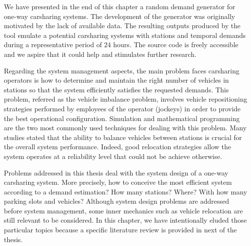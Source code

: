 \begin{bibunit}[ieeetr]
\medskip
We have presented in the end of this chapter a random demand generator for one-way carsharing systems.
The development of the generator was originally motivated by the lack of available data.
The resulting outputs produced by the tool emulate a potential carsharing systems with stations and temporal demands during a representative period of $24$ hours.
The source code is freely accessible \cite{csgen} and we aspire that it could help and stimulates further research.


\medskip
Regarding the system management aspects, the main problem faces carsharing operators is how to determine and maintain the right number of vehicles in stations so that the system efficiently satisfies the requested demands.
This problem, referred as the vehicle imbalance problem, involves vehicle repositioning strategies performed by employees of the operator (jockeys) in order to provide the best operational configuration.
Simulation and mathematical programming are the two most commonly used techniques for dealing with this problem.
Many studies stated that the ability to balance vehicles between stations is crucial for the overall system performance.
Indeed, good relocation strategies allow the system operates at a reliability level that could not be achieve otherwise.


\medskip
Problems addressed in this thesis deal with the system design of a one-way carsharing system.
More precisely, how to conceive the most efficient system according to a demand estimation?
How many stations?
Where?
With how many parking slots and vehicles?
Although system design problems are addressed before system management, some inner mechanics such as vehicle relocation are still relevant to be considered.
In this chapter, we have intentionally eluded those particular topics because a specific literature review is provided in next of the thesis.



\newpage
{}
\renewcommand{\bibname}{Bibliography of chapter \thechapter}
\end{bibunit}

